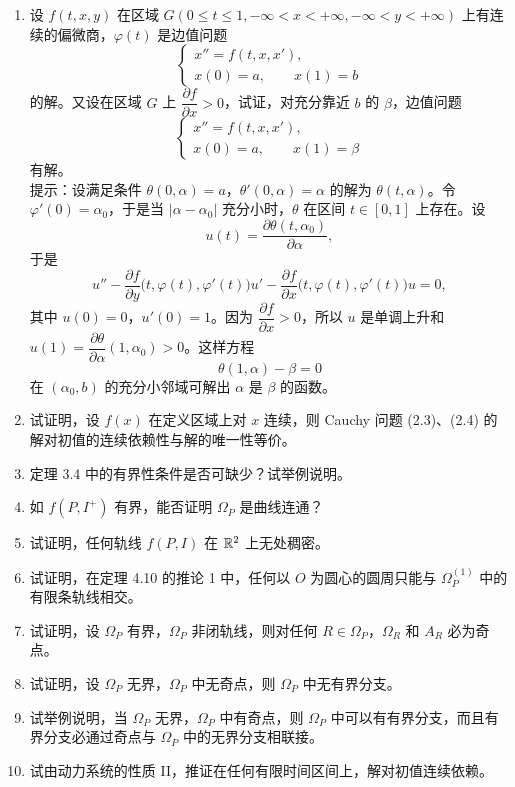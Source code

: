 \begin{enumerate}
\item 设 $f(t,x,y)$ 在区域 $G(0\leq t\leq1,-\infty<x<+\infty,-\infty<y<+\infty)$ 上有连续的偏微商，$\varphi(t)$ 是边值问题
\[
	\begin{cases}
		x''=f(t,x,x'),\\
		x(0)=a,\qquad x(1)=b
	\end{cases}
\]
的解。又设在区域 $G$ 上 $\dfrac{\partial f}{\partial x}>0$，试证，对充分靠近 $b$ 的 $\beta$，边值问题
\[
	\begin{cases}
		x''=f(t,x,x'),\\
		x(0)=a,\qquad x(1)=\beta
	\end{cases}
\]
有解。\\
提示：设满足条件 $\theta(0,\alpha)=a$，$\theta'(0,\alpha)=\alpha$ 的解为 $\theta(t,\alpha)$。令 $\varphi'(0)=\alpha_0$，于是当 $|\alpha-\alpha_0|$ 充分小时，$\theta$ 在区间 $t\in[0,1]$ 上存在。设
\[
	u(t)=\dfrac{\partial\theta(t,\alpha_0)}{\partial\alpha},
\]
于是
\[
	u''-\dfrac{\partial f}{\partial y}\bigl(t,\varphi(t),\varphi'(t)\bigr)u'
	-\dfrac{\partial f}{\partial x}\bigl(t,\varphi(t),\varphi'(t)\bigr)u=0,
\]
其中 $u(0)=0$，$u'(0)=1$。因为 $\dfrac{\partial f}{\partial x}>0$，所以 $u$ 是单调上升和 $u(1)=\dfrac{\partial\theta}{\partial\alpha}(1,\alpha_0)>0$。这样方程
\[
	\theta(1,\alpha)-\beta=0
\]
在 $(\alpha_0,b)$ 的充分小邻域可解出 $\alpha$ 是 $\beta$ 的函数。

\item 试证明，设 $f(x)$ 在定义区域上对 $x$ 连续，则 Cauchy 问题 (2.3)、(2.4) 的解对初值的连续依赖性与解的唯一性等价。

\item 定理 3.4 中的有界性条件是否可缺少？试举例说明。

\item 如 $f(P,I^+)$ 有界，能否证明 $\Omega_P$ 是曲线连通？

\item 试证明，任何轨线 $f(P,I)$ 在 $\mathbb{R}^2$ 上无处稠密。

\item 试证明，在定理 4.10 的推论 1 中，任何以 $O$ 为圆心的圆周只能与 $\Omega_P^{(1)}$ 中的有限条轨线相交。

\item 试证明，设 $\Omega_P$ 有界，$\Omega_P$ 非闭轨线，则对任何 $R\in\Omega_P$，$\Omega_R$ 和 $A_R$ 必为奇点。

\item 试证明，设 $\Omega_P$ 无界，$\Omega_P$ 中无奇点，则 $\Omega_P$ 中无有界分支。

\item 试举例说明，当 $\Omega_P$ 无界，$\Omega_P$ 中有奇点，则 $\Omega_P$ 中可以有有界分支，而且有界分支必通过奇点与 $\Omega_P$ 中的无界分支相联接。

\item 试由动力系统的性质 II，推证在任何有限时间区间上，解对初值连续依赖。
\end{enumerate}

